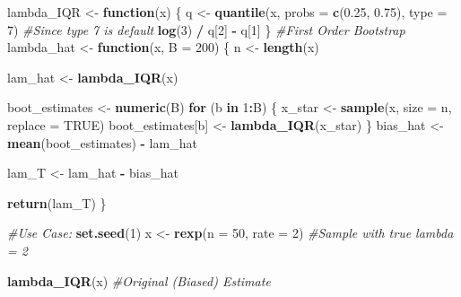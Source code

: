 \documentclass[
]{article}
\newenvironment{Shaded}{\begin{snugshade}}{\end{snugshade}}
\newcommand{\AttributeTok}[1]{\textcolor[rgb]{0.13,0.29,0.53}{#1}}
\newcommand{\CommentTok}[1]{\textcolor[rgb]{0.56,0.35,0.01}{\textit{#1}}}
\newcommand{\ConstantTok}[1]{\textcolor[rgb]{0.56,0.35,0.01}{#1}}
\newcommand{\ControlFlowTok}[1]{\textcolor[rgb]{0.13,0.29,0.53}{\textbf{#1}}}
\newcommand{\DecValTok}[1]{\textcolor[rgb]{0.00,0.00,0.81}{#1}}
\newcommand{\FloatTok}[1]{\textcolor[rgb]{0.00,0.00,0.81}{#1}}
\newcommand{\FunctionTok}[1]{\textcolor[rgb]{0.13,0.29,0.53}{\textbf{#1}}}
\newcommand{\NormalTok}[1]{#1}
\newcommand{\OtherTok}[1]{\textcolor[rgb]{0.56,0.35,0.01}{#1}}
\newcommand{\SpecialCharTok}[1]{\textcolor[rgb]{0.81,0.36,0.00}{\textbf{#1}}}
\begin{document}
\begin{Shaded}
\begin{Highlighting}[]
\NormalTok{lambda\_IQR }\OtherTok{\textless{}{-}} \ControlFlowTok{function}\NormalTok{(x) \{}
\NormalTok{  q }\OtherTok{\textless{}{-}} \FunctionTok{quantile}\NormalTok{(x, }\AttributeTok{probs =} \FunctionTok{c}\NormalTok{(}\FloatTok{0.25}\NormalTok{, }\FloatTok{0.75}\NormalTok{),}
                \AttributeTok{type =} \DecValTok{7}\NormalTok{) }\CommentTok{\#Since type 7 is default}
  \FunctionTok{log}\NormalTok{(}\DecValTok{3}\NormalTok{) }\SpecialCharTok{/}\NormalTok{ q[}\DecValTok{2}\NormalTok{] }\SpecialCharTok{{-}}\NormalTok{ q[}\DecValTok{1}\NormalTok{]}
\NormalTok{\}}
\CommentTok{\#First Order Bootstrap}
\NormalTok{lambda\_hat }\OtherTok{\textless{}{-}} \ControlFlowTok{function}\NormalTok{(x, }\AttributeTok{B =} \DecValTok{200}\NormalTok{) \{}
\NormalTok{  n }\OtherTok{\textless{}{-}} \FunctionTok{length}\NormalTok{(x)}
  
\NormalTok{  lam\_hat }\OtherTok{\textless{}{-}} \FunctionTok{lambda\_IQR}\NormalTok{(x)}
  
\NormalTok{  boot\_estimates }\OtherTok{\textless{}{-}} \FunctionTok{numeric}\NormalTok{(B)}
  \ControlFlowTok{for}\NormalTok{ (b }\ControlFlowTok{in} \DecValTok{1}\SpecialCharTok{:}\NormalTok{B) \{}
\NormalTok{    x\_star }\OtherTok{\textless{}{-}} \FunctionTok{sample}\NormalTok{(x, }\AttributeTok{size =}\NormalTok{ n, }\AttributeTok{replace =} \ConstantTok{TRUE}\NormalTok{)}
\NormalTok{    boot\_estimates[b] }\OtherTok{\textless{}{-}} \FunctionTok{lambda\_IQR}\NormalTok{(x\_star)}
\NormalTok{  \}}
\NormalTok{  bias\_hat }\OtherTok{\textless{}{-}} \FunctionTok{mean}\NormalTok{(boot\_estimates) }\SpecialCharTok{{-}}\NormalTok{ lam\_hat}
  
\NormalTok{  lam\_T }\OtherTok{\textless{}{-}}\NormalTok{ lam\_hat }\SpecialCharTok{{-}}\NormalTok{ bias\_hat}
  
  \FunctionTok{return}\NormalTok{(lam\_T)}
\NormalTok{  \}}
\end{Highlighting}
\end{Shaded}

\begin{Shaded}
\begin{Highlighting}[]
\CommentTok{\#Use Case:}
\FunctionTok{set.seed}\NormalTok{(}\DecValTok{1}\NormalTok{)}
\NormalTok{x }\OtherTok{\textless{}{-}} \FunctionTok{rexp}\NormalTok{(}\AttributeTok{n =} \DecValTok{50}\NormalTok{, }\AttributeTok{rate =} \DecValTok{2}\NormalTok{) }\CommentTok{\#Sample with true lambda = 2}

\FunctionTok{lambda\_IQR}\NormalTok{(x) }\CommentTok{\#Original (Biased) Estimate}
\end{Highlighting}
\end{Shaded}
\end{document}
